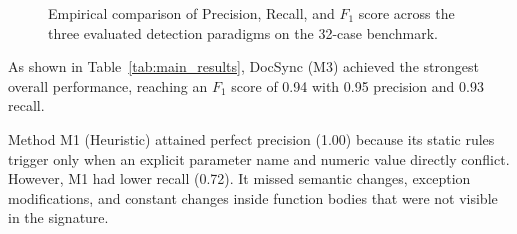 \documentclass[12pt,onecolumn,draftclsnofoot]{IEEEtran}
\begin{document}
\begin{figure}[t]
{%
}
\caption{Empirical comparison of Precision, Recall, and $F_1$ score across the three evaluated detection paradigms on the 32-case benchmark.}
\label{fig:results_comparison}
\end{figure}

\begin{table}[t]
\centering
\caption{Empirical Performance Comparison across Detection Methods on the 32-Case Benchmark}
\label{tab:main_results}
\end{table}

As shown in Table~\ref{tab:main_results}, DocSync (M3) achieved the strongest overall performance, reaching an $F_1$ score of 0.94 with 0.95 precision and 0.93 recall.

Method M1 (Heuristic) attained perfect precision (1.00) because its static rules trigger only when an explicit parameter name and numeric value directly conflict. However, M1 had lower recall (0.72). It missed semantic changes, exception modifications, and constant changes inside function bodies that were not visible in the signature.
\end{document}
